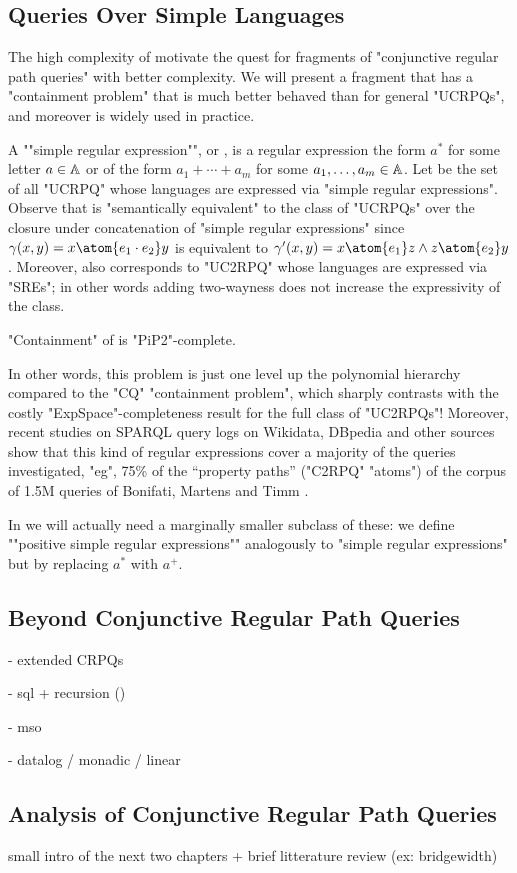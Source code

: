 \subsection{Queries Over Simple Languages}

The high complexity of  motivate
the quest for fragments of "conjunctive regular path queries" with better complexity.
We will present a fragment {\UCRPQSRE} that
has a "containment problem" that is much better behaved than for general "UCRPQs",
and moreover is widely used in practice.

\AP A ""simple regular expression"", or , is a regular expression the form $a^*$ for some letter $a \in \mathbb{A}$ or of the form $a_1 + \dotsb + a_m$ for some $a_1, \dotsc, a_m \in \mathbb{A}$. 
\AP Let \intro*{\UCRPQSRE} be the set of all "UCRPQ" whose languages are expressed via "simple regular expressions". Observe that {\UCRPQSRE} is "semantically equivalent" to the class of "UCRPQs" over the closure under concatenation of "simple regular expressions"
since $\gamma(x,y) = x \atom{e_1 \cdot e_2} y$ is equivalent to $\gamma'(x,y) = x \atom{e_1} z \land  z \atom{e_2} y$.
Moreover, \UCRPQSRE{} also corresponds to "UC2RPQ" whose languages are expressed via "SREs";
in other words adding two-wayness does not increase the expressivity of the class. 

\begin{proposition}
    "Containment" of {\UCRPQSRE} is "PiP2"-complete.
\end{proposition}

In other words, this problem is just one level up the polynomial hierarchy compared to the "CQ" "containment problem", which sharply contrasts with the costly "ExpSpace"-completeness result
for the full class of "UC2RPQs"!
Moreover, recent studies on SPARQL query logs on Wikidata, DBpedia and other sources show that this kind of regular expressions cover a majority of the queries investigated, "eg", 75\% of
the ``property paths'' ("C2RPQ" "atoms") of the corpus of 1.5M queries of Bonifati, Martens and Timm \cite[Table 15]{BonifatiMartensTimm2020SPARQL}.

In  we will actually need a marginally smaller subclass of these:
we define \AP""positive simple regular expressions"" analogously to
"simple regular expressions" but by replacing $a^*$ with $a^+$.


\subsection{Beyond Conjunctive Regular Path Queries}

\todo{}
- extended CRPQs

- sql + recursion ()

- mso

- datalog / monadic / linear

\subsection{Analysis of Conjunctive Regular Path Queries}

\todo{}
small intro of the next two chapters
+ brief litterature review (ex: bridgewidth)